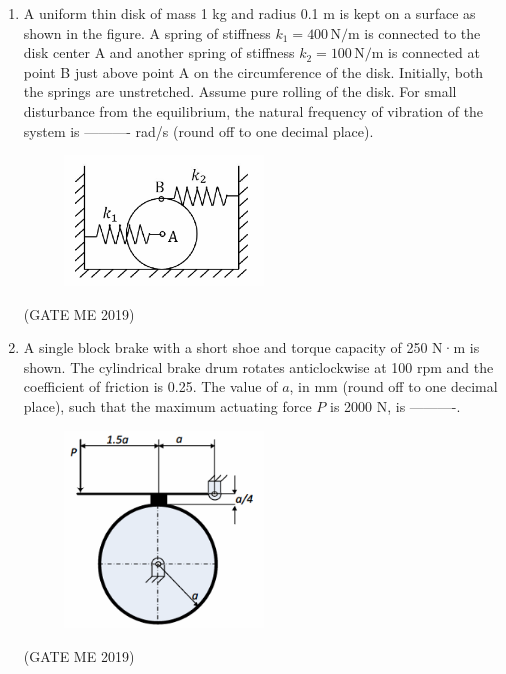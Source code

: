 \documentclass[journal]{IEEEtran}
\begin{document}
\begin{enumerate}
\item A uniform thin disk of mass 1 kg and radius 0.1 m is kept on a surface as shown in the figure. A spring of stiffness $ k_1 = 400 \, \text{N/m} $ is connected to the disk center A and another spring of stiffness $ k_2 = 100 \, \text{N/m} $ is connected at point B just above point A on the circumference of the disk. Initially, both the springs are unstretched. Assume pure rolling of the disk. For small disturbance from the equilibrium, the natural frequency of vibration of the system is ---------- rad/s (round off to one decimal place).

\begin{figure}[H]
\centering
\includegraphics[width=0.5\textwidth]{Fig 15.png}
\caption{}
\label{fig:question43}
\end{figure}
\hfill (GATE ME 2019)

\item A single block brake with a short shoe and torque capacity of 250 N·m is shown. The cylindrical brake drum rotates anticlockwise at 100 rpm and the coefficient of friction is 0.25. The value of $ a $, in mm (round off to one decimal place), such that the maximum actuating force $ P $ is 2000 N, is ----------.

\begin{figure}[H]
\centering
\includegraphics[width=0.5\textwidth]{Fig 16.png}
\caption{}
\label{fig:question44}
\end{figure}
\hfill (GATE ME 2019)


\end{enumerate}
\end{document}

